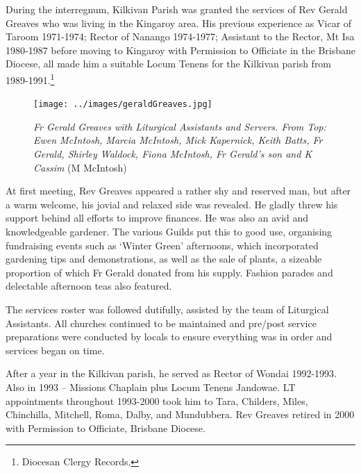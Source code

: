 During the interregnum, Kilkivan Parish was granted the services of Rev Gerald Greaves who was living in the Kingaroy area. His previous experience as Vicar of Taroom 1971-1974; Rector of Nanango 1974-1977; Assistant to the Rector, Mt Isa 1980-1987 before moving to Kingaroy with Permission to Officiate in the Brisbane Diocese, all made him a suitable Locum Tenens for the Kilkivan parish from 1989-1991.\footnote{Diocesan Clergy Records.}








\begin{figure}[!htb]
\begin{center}
\texttt{[image: ../images/geraldGreaves.jpg]}
\caption{{\itshape Fr Gerald Greaves with Liturgical Assistants and Servers. From Top: Ewen McIntosh, Marcia McIntosh, Mick Kapernick, Keith Batts, Fr Gerald, Shirley Waldock, Fiona McIntosh, Fr Gerald's son and K Cassim} {\scriptsize(M McIntosh)}}
\end{center}
\end{figure}




At first meeting, Rev Greaves appeared a rather shy and reserved man, but after a warm welcome, his jovial and relaxed side was revealed. He gladly threw his support behind all efforts to improve finances. He was also an avid and knowledgeable gardener. The various Guilds put this to good use, organising fundraising events such as `Winter Green' afternoons, which incorporated gardening tips and demonstrations, as well as the sale of plants, a sizeable proportion of which Fr Gerald donated from his supply. Fashion parades and delectable afternoon teas also featured.



The services roster was followed dutifully, assisted by the team of Liturgical Assistants. All churches continued to be maintained and pre/post service preparations were conducted by locals to ensure everything was in order and services began on time.



After a year in the Kilkivan parish, he served as Rector of Wondai 1992-1993. Also in 1993 -- Missions Chaplain plus Locum Tenens Jandowae. LT appointments throughout 1993-2000 took him to Tara, Childers, Miles, Chinchilla, Mitchell, Roma, Dalby, and Mundubbera. Rev Greaves retired in 2000 with Permission to Officiate, Brisbane Diocese.



